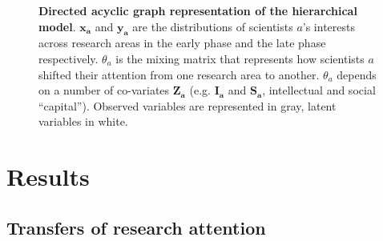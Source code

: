 \documentclass{article}
\begin{document}
\begin{figure}[h]
    \centering
    \caption{\textbf{Directed acyclic graph representation of the hierarchical model}. $\bm{x_a}$ and $\bm{y_a}$ are the distributions of scientists $a$'s interests across research areas in the early phase and the late phase respectively. $\theta_a$ is the mixing matrix that represents how scientists $a$ shifted their attention from one research area to another. $\theta_a$ depends on a number of co-variates $\bm{Z_a}$ (e.g. $\bm{I_a}$ and $\bm{S_a}$, intellectual and social ``capital''). Observed variables are represented in gray, latent variables in white.}
    \label{fig:model_structure}
\end{figure}


 \section{\label{sec:results}Results}

 \subsection{\label{sec:macro}Transfers of research attention}
\end{document}
